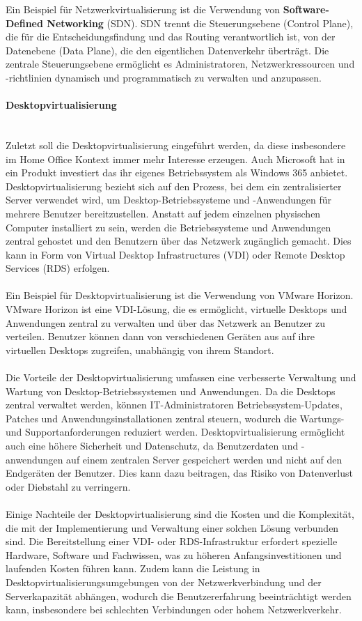\documentclass[../vs-script-first-v01.tex]{subfiles}
\begin{document}
Ein Beispiel für Netzwerkvirtualisierung ist die Verwendung von \textbf{Software-Defined Networking} (SDN). SDN trennt die Steuerungsebene (Control Plane), die für die Entscheidungsfindung und das Routing verantwortlich ist, von der Datenebene (Data Plane), die den eigentlichen Datenverkehr überträgt. Die zentrale Steuerungsebene ermöglicht es Administratoren, Netzwerkressourcen und -richtlinien dynamisch und programmatisch zu verwalten und anzupassen.

\paragraph{Desktopvirtualisierung\\\\}
Zuletzt soll die Desktopvirtualisierung eingeführt werden, da diese insbesondere im Home Office Kontext immer mehr Interesse erzeugen. Auch Microsoft hat in ein Produkt investiert das ihr eigenes Betriebssystem als Windows 365 anbietet. Desktopvirtualisierung bezieht sich auf den Prozess, bei dem ein zentralisierter Server verwendet wird, um Desktop-Betriebssysteme und -Anwendungen für mehrere Benutzer bereitzustellen. Anstatt auf jedem einzelnen physischen Computer installiert zu sein, werden die Betriebssysteme und Anwendungen zentral gehostet und den Benutzern über das Netzwerk zugänglich gemacht. Dies kann in Form von Virtual Desktop Infrastructures (VDI) oder Remote Desktop Services (RDS) erfolgen.
\\\\
Ein Beispiel für Desktopvirtualisierung ist die Verwendung von VMware Horizon. VMware Horizon ist eine VDI-Lösung, die es ermöglicht, virtuelle Desktops und Anwendungen zentral zu verwalten und über das Netzwerk an Benutzer zu verteilen. Benutzer können dann von verschiedenen Geräten aus auf ihre virtuellen Desktops zugreifen, unabhängig von ihrem Standort.
\\\\
Die Vorteile der Desktopvirtualisierung umfassen eine verbesserte Verwaltung und Wartung von Desktop-Betriebssystemen und Anwendungen. Da die Desktops zentral verwaltet werden, können IT-Administratoren Betriebssystem-Updates, Patches und Anwendungsinstallationen zentral steuern, wodurch die Wartungs- und Supportanforderungen reduziert werden. Desktopvirtualisierung ermöglicht auch eine höhere Sicherheit und Datenschutz, da Benutzerdaten und -anwendungen auf einem zentralen Server gespeichert werden und nicht auf den Endgeräten der Benutzer. Dies kann dazu beitragen, das Risiko von Datenverlust oder Diebstahl zu verringern.
\\\\
Einige Nachteile der Desktopvirtualisierung sind die Kosten und die Komplexität, die mit der Implementierung und Verwaltung einer solchen Lösung verbunden sind. Die Bereitstellung einer VDI- oder RDS-Infrastruktur erfordert spezielle Hardware, Software und Fachwissen, was zu höheren Anfangsinvestitionen und laufenden Kosten führen kann. Zudem kann die Leistung in Desktopvirtualisierungsumgebungen von der Netzwerkverbindung und der Serverkapazität abhängen, wodurch die Benutzererfahrung beeinträchtigt werden kann, insbesondere bei schlechten Verbindungen oder hohem Netzwerkverkehr.
\end{document}
